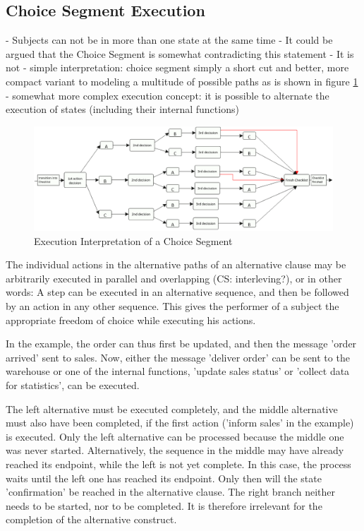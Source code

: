 \subsection{Choice Segment Execution}
\label{sec:choiceSegmentExecution}

- Subjects can not be in more than one state at the same time
- It could be argued that the Choice Segment is somewhat contradicting this statement
- It is not
- simple interpretation: choice segment simply a short cut and better, more compact variant to modeling a multitude of possible paths as is shown in figure \ref{fig:choiceSegmentExecutionInterpretation}
- somewhat more complex execution concept: it is possible to alternate the execution of states (including their internal functions)

\begin{figure}[htbp]
	\centering
	\includegraphics[width=0.5\linewidth]{Figures/Ontology/SubjectBehavior/ChoiceSegmentInterpretation.png}
	\caption[Execution Interpretation of a Choice Segment]{Execution Interpretation of a Choice Segment}
	\label{fig:choiceSegmentExecutionInterpretation}
\end{figure}

The individual actions in the alternative paths of an alternative clause may be arbitrarily executed in parallel and overlapping (CS: interleving?), or in other words: A step can be executed in an alternative sequence, and then be followed by an action in any other sequence. This gives the performer of a subject the appropriate freedom of choice while executing his actions.

In the example, the order can thus first be updated, and then the message 'order arrived' sent to sales. Now, either the message 'deliver order' can be sent to the warehouse or one of the internal functions, 'update sales status' or 'collect data for statistics', can be executed.

The left alternative must be executed completely, and the middle alternative must also have been completed, if the first action ('inform sales' in the example) is executed. Only the left alternative can be processed because the middle one was never started. Alternatively, the sequence in the middle may have already reached its endpoint, while the left is not yet complete. In this case, the process waits until the left one has reached its endpoint. Only then will the state 'confirmation' be reached in the alternative clause. The right branch neither needs to be started, nor to be completed. It is therefore irrelevant for the completion of the alternative construct.



